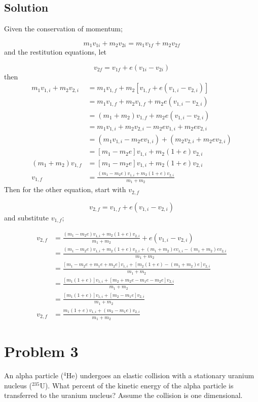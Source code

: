 \documentclass{article}
\begin{document}
\subsection*{Solution}
Given the conservation of momentum;

\[
	m_1v_{1i} + m_2v_{2i} = m_1v_{1f} + m_2v_{2f}
\]
and the restitution equations, let

\[
	v_{2f} = v_{1f} + e(v_{1i}-v_{2i})
\]
then
\begin{align*}
	m_1 v_{1,i} + m_2 v_{2,i} &= m_1 v_{1,f} + m_2 \left[ v_{1,f} + e (v_{1,i} - v_{2,i}) \right] \\
	 &= m_1 v_{1,f} + m_2 v_{1,f} + m_2 e (v_{1,i} - v_{2,i}) \\
	 &= (m_1 + m_2) v_{1,f} + m_2 e (v_{1,i} - v_{2,i}) \\
	 &= m_1 v_{1,i} + m_2 v_{2,i} - m_2 e v_{1,i} + m_2 e v_{2,i} \\
	 &= (m_1 v_{1,i} - m_2 e v_{1,i}) + (m_2 v_{2,i} + m_2 e v_{2,i}) \\
	 &= \left[ m_1 - m_2 e \right] v_{1,i} + m_2 (1 + e) v_{2,i} \\
	(m_1 + m_2) v_{1,f} &= \left[ m_1 - m_2 e \right] v_{1,i} + m_2 (1 + e) v_{2,i} \\
	v_{1,f} &= \frac{ (m_1 - m_2 e) v_{1,i} + m_2 (1 + e) v_{2,i} }{ m_1 + m_2 }
\end{align*}
Then for the other equation, start with $v_{2,f}$

\[
v_{2,f} = v_{1,f} + e (v_{1,i} - v_{2,i})
\]
and substitute \( v_{1,f} \);

\begin{align*}
	v_{2,f} &= \frac{ (m_1 - m_2 e) v_{1,i} + m_2 (1 + e) v_{2,i} }{ m_1 + m_2 } + e (v_{1,i} - v_{2,i}) \\
&= \frac{(m_1 - m_2 e) v_{1,i} + m_2 (1 + e) v_{2,i} + (m_1 + m_2) e v_{1,i} - (m_1 + m_2) e v_{2,i}} { m_1 + m_2 }\\
&= \frac{[m_1 - m_2 e + m_1 e + m_2 e] v_{1,i} + [m_2 (1 + e) - (m_1 + m_2) e] v_{2,i}} { m_1 + m_2 }\\
&= \frac{[m_1 (1 + e)] v_{1,i} + [m_2 + m_2 e - m_1 e - m_2 e] v_{2,i}} { m_1 + m_2 }\\
&= \frac{[m_1 (1 + e)] v_{1,i} + [m_2 - m_1 e] v_{2,i}} { m_1 + m_2 }\\
	v_{2,f} &= \frac{ m_1 (1 + e) v_{1,i} + (m_2 - m_1 e) v_{2,i} }{ m_1 + m_2 }
\end{align*}


\section*{Problem 3}
An alpha particle ($^4$He) undergoes an elastic collision with a stationary uranium nucleus ($^235$U). What
percent of the kinetic energy of the alpha particle is transferred to the uranium nucleus? Assume the
collision is one dimensional.
\end{document}
